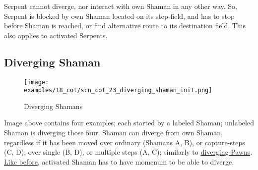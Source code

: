 \vspace*{-0.5\baselineskip}
Serpent cannot diverge, nor interact with own Shaman in any other way. So, Serpent
is blocked by own Shaman located on its step-field, and has to stop before Shaman
is reached, or find alternative route to its destination field. This also applies
to activated Serpents.

\clearpage %

\subsection*{Diverging Shaman}
\label{sec:Conquest of Tlalocan/Shaman/Movement/Diverging Shaman}

\vspace*{-1.4\baselineskip}
\noindent
\begin{figure}[!h]
\texttt{[image: examples/18\_cot/scn\_cot\_23\_diverging\_shaman\_init.png]}
\vspace*{-1.3\baselineskip}
\caption{Diverging Shamans}
\label{fig:scn_cot_23_diverging_shaman_init}
\end{figure}

\vspace*{-0.5\baselineskip}
Image above contains four examples; each started by a labeled Shaman; unlabeled
Shaman is diverging those four. \newline %
\indent
Shaman can diverge from own Shaman, regardless if it has been moved over ordinary
(Shamans A, B), or capture-steps (C, D); over single (B, D), or multiple steps (A, C);
similarly to \hyperref[fig:scn_cot_13_diverging_pawn_init]{diverging Pawns}.
\hyperref[fig:scn_cot_11_diverging_activated_piece_init]{Like before}, activated
Shaman has to have momenum to be able to diverge.

%
%


\clearpage %

